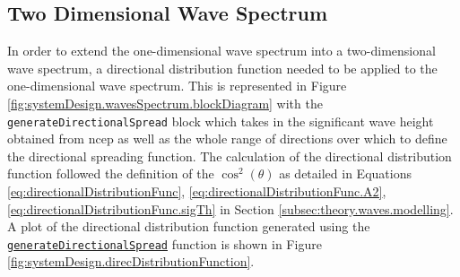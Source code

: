 \subsection{Two Dimensional Wave Spectrum} \label{subsec:systemDesign.waveSpectrum.2DSpectrum}

In order to extend the one-dimensional wave spectrum into a two-dimensional wave spectrum, a directional distribution function needed to be applied to the one-dimensional wave spectrum. This is represented in Figure \ref{fig:systemDesign.wavesSpectrum.blockDiagram} with the \lstinline{generateDirectionalSpread} block which takes in the significant wave height obtained from \acs{ncep} as well as the whole range of directions over which to define the directional spreading function. The calculation of the directional distribution function followed the definition of the $\cos^2(\theta)$ as detailed in Equations \ref{eq:directionalDistributionFunc}, \ref{eq:directionalDistributionFunc.A2}, \ref{eq:directionalDistributionFunc.sigTh} in Section \ref{subsec:theory.waves.modelling}. A plot of the directional distribution function generated using the \href{https://github.com/JNSRYA006/sar-parameter-extraction-pipeline/blob/main/functions/waveSpectra/generateDirectionalDistribution.m}{\lstinline{generateDirectionalSpread}} function is shown in Figure \ref{fig:systemDesign.direcDistributionFunction}.






                    
